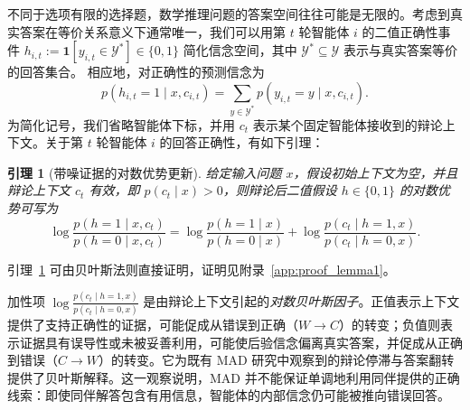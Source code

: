 \documentclass{article}
\theoremstyle{plain}
\newtheorem{lemma}[theorem]{引理}
\theoremstyle{definition}
\theoremstyle{remark}
\begin{document}
不同于选项有限的选择题，数学推理问题的答案空间往往可能是无限的。考虑到真实答案在等价关系意义下通常唯一，我们可以用第 $t$ 轮智能体 $i$ 的二值正确性事件 $h_{i,t} := \mathbf{1}[y_{i,t}\in \mathcal{Y}^*]\in\{0,1\}$ 简化信念空间，其中 $\mathcal{Y}^*\subseteq\mathcal{Y}$ 表示与真实答案等价的回答集合。
相应地，对正确性的预测信念为
\begin{equation*}
p(h_{i,t}=1\mid x,c_{i,t})
=
\sum_{y\in \mathcal{Y}^*} p(y_{i,t}=y\mid x,c_{i,t}).
\end{equation*}
为简化记号，我们省略智能体下标，并用 $c_t$ 表示某个固定智能体接收到的辩论上下文。关于第 $t$ 轮智能体 $i$ 的回答正确性，有如下引理：
\begin{lemma}[带噪证据的对数优势更新]\label{lem:log_odds}
给定输入问题 $x$，假设初始上下文为空，并且辩论上下文 $c_t$ 有效，即 $p(c_t\mid x)>0$，则辩论后二值假设 $h\in\{0,1\}$ 的对数优势可写为
{\small
\begin{equation*}
    \log \frac{p(h=1 \mid x,c_t)}{p(h=0 \mid x,c_t)}
=
\log \frac{p(h=1 \mid x)}{p(h=0 \mid x)}
+
\log \frac{p(c_t \mid h=1, x)}{p(c_t \mid h=0, x)}.
\end{equation*}
}
\end{lemma}

引理~\ref{lem:log_odds} 可由贝叶斯法则直接证明，证明见附录~\ref{app:proof_lemma1}。


加性项 $\log \frac{p(c_t \mid h=1, x)}{p(c_t \mid h=0, x)}$ 是由辩论上下文引起的\textit{对数贝叶斯因子}。正值表示上下文提供了支持正确性的证据，可能促成从错误到正确（$W\to C$）的转变；负值则表示证据具有误导性或未被妥善利用，可能使后验信念偏离真实答案，并促成从正确到错误（$C\to W$）的转变。它为既有 MAD 研究中观察到的辩论停滞与答案翻转 \cite{choi2025debate, wynn2025talk, yao2025peacemaker} 提供了贝叶斯解释。这一观察说明，MAD 并不能保证单调地利用同伴提供的正确线索：即使同伴解答包含有用信息，智能体的内部信念仍可能被推向错误回答。
\end{document}
